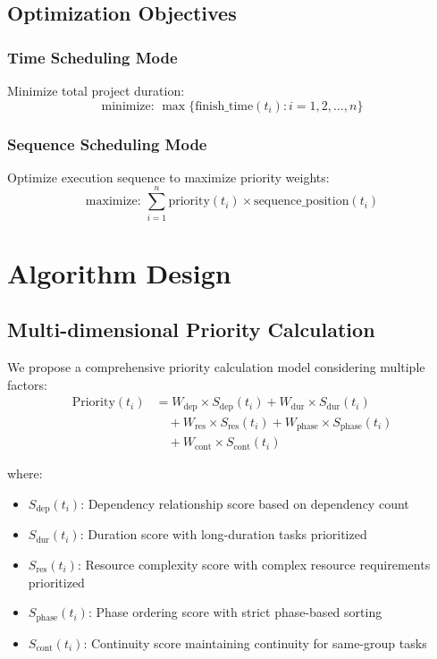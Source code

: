 \documentclass[journal]{IEEEtran}
\begin{document}
\subsection{Optimization Objectives}

\subsubsection{Time Scheduling Mode}
Minimize total project duration:
\begin{equation}
\text{minimize: } \max\{\text{finish\_time}(t_i) : i = 1, 2, \ldots, n\}
\end{equation}

\subsubsection{Sequence Scheduling Mode}
Optimize execution sequence to maximize priority weights:
\begin{equation}
\text{maximize: } \sum_{i=1}^{n} \text{priority}(t_i) \times \text{sequence\_position}(t_i)
\end{equation}

\section{Algorithm Design}

\subsection{Multi-dimensional Priority Calculation}
We propose a comprehensive priority calculation model considering multiple factors:
\begin{equation}
\begin{aligned}
\text{Priority}(t_i) &= W_{\text{dep}} \times S_{\text{dep}}(t_i) + W_{\text{dur}} \times S_{\text{dur}}(t_i) \\
&\quad + W_{\text{res}} \times S_{\text{res}}(t_i) + W_{\text{phase}} \times S_{\text{phase}}(t_i) \\
&\quad + W_{\text{cont}} \times S_{\text{cont}}(t_i)
\end{aligned}
\end{equation}

where:
\begin{itemize}
\item $S_{\text{dep}}(t_i)$: Dependency relationship score based on dependency count
\item $S_{\text{dur}}(t_i)$: Duration score with long-duration tasks prioritized
\item $S_{\text{res}}(t_i)$: Resource complexity score with complex resource requirements prioritized
\item $S_{\text{phase}}(t_i)$: Phase ordering score with strict phase-based sorting
\item $S_{\text{cont}}(t_i)$: Continuity score maintaining continuity for same-group tasks
\end{itemize}
\end{document}
